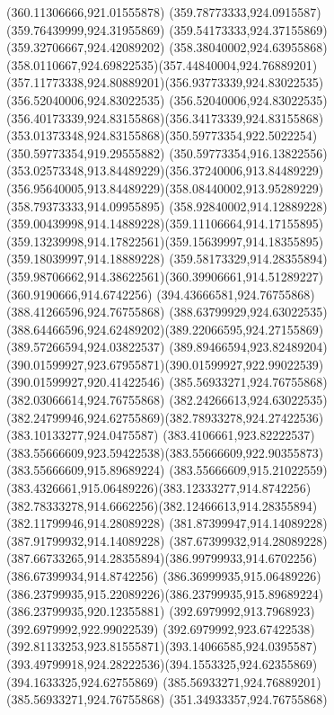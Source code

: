 {{		\lineto(360.11306666,921.01555878)
		\lineto(359.78773333,924.0915587)
		\lineto(359.76439999,924.31955869)
		\lineto(359.54173333,924.37155869)
		\lineto(359.32706667,924.42089202)
		\curveto(358.38040002,924.63955868)(358.0110667,924.69822535)(357.44840004,924.76889201)
		\curveto(357.11773338,924.80889201)(356.93773339,924.83022535)(356.52040006,924.83022535)
		\curveto(356.52040006,924.83022535)(356.40173339,924.83155868)(356.34173339,924.83155868)
		\curveto(353.01373348,924.83155868)(350.59773354,922.5022254)(350.59773354,919.29555882)
		\curveto(350.59773354,916.13822556)(353.02573348,913.84489229)(356.37240006,913.84489229)
		\curveto(356.95640005,913.84489229)(358.08440002,913.95289229)(358.79373333,914.09955895)
		\curveto(358.92840002,914.12889228)(359.00439998,914.14889228)(359.11106664,914.17155895)
		\curveto(359.13239998,914.17822561)(359.15639997,914.18355895)(359.18039997,914.18889228)
		\curveto(359.58173329,914.28355894)(359.98706662,914.38622561)(360.39906661,914.51289227)
		\lineto(360.9190666,914.6742256)
		\closepath
		\moveto(394.43666581,924.76755868)
		\lineto(388.41266596,924.76755868)
		\lineto(388.63799929,924.63022535)
		\curveto(388.64466596,924.62489202)(389.22066595,924.27155869)(389.57266594,924.03822537)
		\curveto(389.89466594,923.82489204)(390.01599927,923.67955871)(390.01599927,922.99022539)
		\lineto(390.01599927,920.41422546)
		\lineto(385.56933271,924.76755868)
		\lineto(382.03066614,924.76755868)
		\lineto(382.24266613,924.63022535)
		\curveto(382.24799946,924.62755869)(382.78933278,924.27422536)(383.10133277,924.0475587)
		\curveto(383.4106661,923.82222537)(383.55666609,923.59422538)(383.55666609,922.90355873)
		\lineto(383.55666609,915.89689224)
		\curveto(383.55666609,915.21022559)(383.4326661,915.06489226)(383.12333277,914.8742256)
		\curveto(382.78333278,914.6662256)(382.12466613,914.28355894)(382.11799946,914.28089228)
		\lineto(381.87399947,914.14089228)
		\lineto(387.91799932,914.14089228)
		\lineto(387.67399932,914.28089228)
		\curveto(387.66733265,914.28355894)(386.99799933,914.6702256)(386.67399934,914.8742256)
		\curveto(386.36999935,915.06489226)(386.23799935,915.22089226)(386.23799935,915.89689224)
		\lineto(386.23799935,920.12355881)
		\lineto(392.6979992,913.7968923)
		\lineto(392.6979992,922.99022539)
		\curveto(392.6979992,923.67422538)(392.81133253,923.81555871)(393.14066585,924.0395587)
		\curveto(393.49799918,924.28222536)(394.1553325,924.62355869)(394.1633325,924.62755869)
		\closepath
		\moveto(385.56933271,924.76889201)
		\lineto(385.56933271,924.76755868)
		\closepath
		\moveto(351.34933357,924.76755868)
}}

